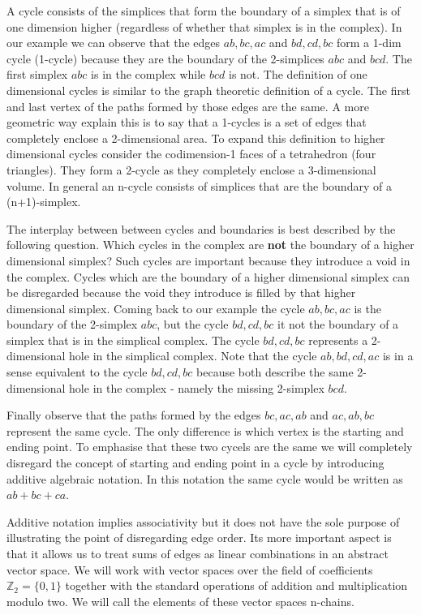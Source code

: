 A cycle consists of the simplices that form the boundary of a simplex that is of one dimension higher (regardless of whether that simplex is in the complex). In our example we can observe that the edges $ab, bc, ac$ and $bd, cd, bc$ form a 1-dim cycle (1-cycle) because they are the boundary of the 2-simplices $abc$ and $bcd$. The first simplex $abc$ is in the complex while $bcd$ is not. The definition of one dimensional cycles is similar to the graph theoretic definition of a cycle. The first and last vertex of the paths formed by those edges are the same. A more geometric way explain this is to say that a 1-cycles is a set of edges that completely enclose a 2-dimensional area. To expand this definition to higher dimensional cycles consider the codimension-1 faces of a tetrahedron (four triangles). They form a 2-cycle as they completely enclose a 3-dimensional volume. In general an n-cycle consists of simplices that are the boundary of a (n+1)-simplex.

The interplay between between cycles and boundaries is best described by the following question. Which cycles in the complex are \textbf{not} the boundary of a higher dimensional simplex? Such cycles are important because they introduce a void in the complex. Cycles which are the boundary of a higher dimensional simplex can be disregarded because the void they introduce is filled by that higher dimensional simplex. Coming back to our example the cycle $ab, bc, ac$ is the boundary of the 2-simplex $abc$, but the cycle $bd, cd, bc$ it not the boundary of a simplex that is in the simplical complex. The cycle $bd, cd, bc$ represents a 2-dimensional hole in the simplical complex. Note that the cycle $ab, bd, cd, ac$ is in a sense equivalent to the cycle $bd, cd, bc$ because both describe the same 2-dimensional hole in the complex - namely the missing 2-simplex $bcd$.

Finally observe that the paths formed by the edges $bc, ac, ab$ and $ac, ab, bc$ represent the same cycle. The only difference is which vertex is the starting and ending point. To emphasise that these two cycels are the same we will completely disregard the concept of starting and ending point in a cycle by introducing additive algebraic notation. In this notation the same cycle would be written as $ab + bc + ca$.

Additive notation implies associativity but it does not have the sole purpose of illustrating the point of disregarding edge order. Its more important aspect is that it allows us to treat sums of edges as linear combinations in an abstract vector space. We will work with vector spaces over the field of coefficients $\mathbb{Z}_2 = \{0, 1\}$ together with the standard operations of addition and multiplication modulo two. We will call the elements of these vector spaces n-chains.

